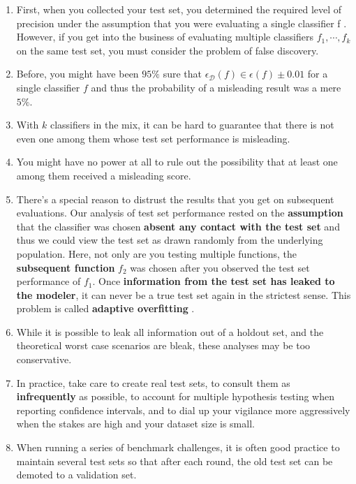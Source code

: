 \begin{fontSizeEnv}{8pt}
\begin{enumerate}
    \item First, when you collected your test set, you determined the required level of precision under the assumption that you were evaluating a single classifier f . However, if you get into the business of evaluating multiple classifiers $f_1, \cdots, f_k$ on the same test set, you must consider the problem of false discovery. 

    \item Before, you might have been $95\%$ sure that $\epsilon_\mathcal{D}(f) \in \epsilon(f) \pm 0.01$ for a single classifier $f$ and thus the probability of a misleading result was a mere $5\%$. 
    
    \item With $k$ classifiers in the mix, it can be hard to guarantee that there is not even one among them whose test set performance is misleading.

    \item You might have no power at all to rule out the possibility that at least one among them received a misleading score.

    \item There’s a special reason to distrust the results that you get on subsequent evaluations. Our analysis of test set performance rested on the \textbf{assumption} that the classifier was chosen \textbf{absent any contact with the test set} and thus we could view the test set as drawn randomly from the underlying population. Here, not only are you testing multiple functions, the \textbf{subsequent function} $f_2$ was chosen after you observed the test set performance of $f_1$. Once \textbf{information from the test set has leaked to the modeler}, it can never be a true test set again in the strictest sense. This problem is called \textbf{adaptive overfitting} .

    \item While it is possible to leak all information out of a holdout set, and the theoretical worst case scenarios are bleak, these analyses may be too conservative. 
    
    \item In practice, take care to create real test sets, to consult them as \textbf{infrequently} as possible, to account for multiple hypothesis testing when reporting confidence intervals, and to dial up your vigilance more aggressively when the stakes are high and your dataset size is small. 
    
    \item When running a series of benchmark challenges, it is often good practice to maintain several test sets so that after each round, the old test set can be demoted to a validation set.
\end{enumerate}

\end{fontSizeEnv}

